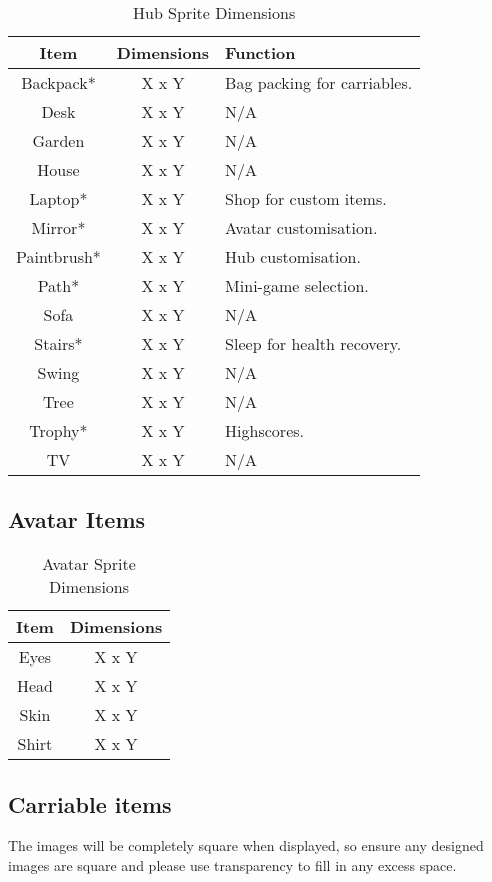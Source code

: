 \documentclass[a4paper,12pt]{article}
\begin{document}
\begin{table}[H]
	\centering
	\begin{tabular}{|c|c|l|}
		\hline
		Item  		& Dimensions	& Function \\ \hline
		Backpack*	& X x Y			& Bag packing for carriables. \\
		Desk		& X x Y			& N/A \\
		Garden		& X x Y			& N/A \\
		House		& X x Y			& N/A \\
		Laptop*		& X x Y			& Shop for custom items. \\
		Mirror*		& X x Y			& Avatar customisation. \\
		Paintbrush*	& X x Y			& Hub customisation. \\
		Path*		& X x Y			& Mini-game selection. \\
		Sofa		& X x Y			& N/A \\
		Stairs*		& X x Y			& Sleep for health recovery. \\
		Swing		& X x Y			& N/A \\
		Tree		& X x Y			& N/A \\
		Trophy*		& X x Y			& Highscores. \\
		TV			& X x Y 		& N/A \\ \hline
	\end{tabular}
	\caption{Hub Sprite Dimensions}
	\label{tab:hub_dimensions}
\end{table}

\subsection{Avatar Items}

\begin{table}[H]
	\centering
	\begin{tabular}{|c|c|}
		\hline
		Item  & Dimensions \\ \hline
		Eyes  & X x Y      \\
		Head  & X x Y      \\
		Skin  & X x Y      \\
		Shirt & X x Y      \\ \hline
	\end{tabular}
	\caption{Avatar Sprite Dimensions}
	\label{tab:avatar_dimensions}
\end{table}

\subsection{Carriable items}

The images will be completely square when displayed, so ensure any designed images are square and please use transparency to fill in any excess space.
\end{document}
